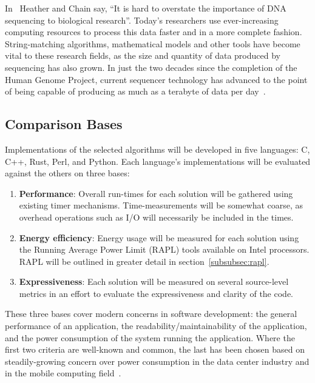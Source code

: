 In~\cite{heather} Heather and Chain say, ``It is hard to overstate the importance of DNA sequencing to biological research''. Today's researchers use ever-increasing computing resources to process this data faster and in a more complete fashion. String-matching algorithms, mathematical models and other tools have become vital to these research fields, as the size and quantity of data produced by sequencing has also grown. In just the two decades since the completion of the Human Genome Project, current sequencer technology has advanced to the point of being capable of producing as much as a terabyte of data per day~\cite{cabral}.

\subsection{Comparison Bases}
\label{subsec:comparison}

Implementations of the selected algorithms will be developed in five languages: C, C++, Rust, Perl, and Python. Each language's implementations will be evaluated against the others on three bases:

\begin{enumerate}
\item \textbf{Performance}: Overall run-times for each solution will be gathered using existing timer mechanisms. Time-measurements will be somewhat coarse, as overhead operations such as I/O will necessarily be included in the times.
\item \textbf{Energy efficiency}: Energy usage will be measured for each solution using the Running Average Power Limit (RAPL) tools available on Intel processors. RAPL will be outlined in greater detail in section~\ref{subsubsec:rapl}.
\item \textbf{Expressiveness}: Each solution will be measured on several source-level metrics in an effort to evaluate the expressiveness and clarity of the code.
\end{enumerate}

These three bases cover modern concerns in software development: the general performance of an application, the readability/maintainability of the application, and the power consumption of the system running the application. Where the first two criteria are well-known and common, the last has been chosen based on steadily-growing concern over power consumption in the data center industry and in the mobile computing field~\cite{pereira}.
